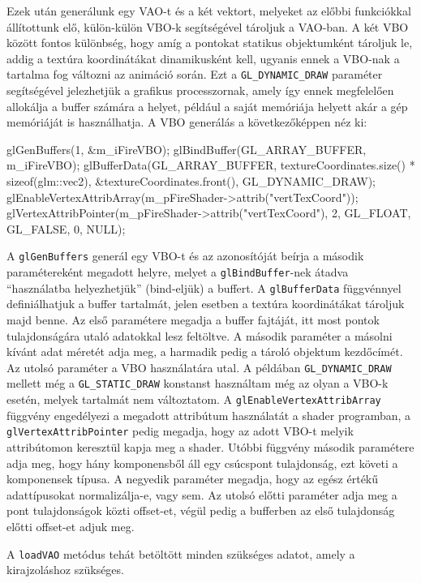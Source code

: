 Ezek után generálunk egy VAO-t és a két vektort, melyeket az előbbi funkciókkal állítottunk elő, külön-külön VBO-k segítségével tároljuk a VAO-ban. A két VBO között fontos különbség, hogy amíg a pontokat statikus objektumként tároljuk le, addig a textúra koordinátákat dinamikusként kell, ugyanis ennek a VBO-nak a tartalma fog változni az animáció során. Ezt a \texttt{GL\_DYNAMIC\_DRAW} paraméter segítségével jelezhetjük a grafikus processzornak, amely így ennek megfelelően allokálja a buffer számára a helyet, például a saját memóriája helyett akár a gép memóriáját is használhatja.
A VBO generálás a következőképpen néz ki:
\begin{cpp}
glGenBuffers(1, &m_iFireVBO);
glBindBuffer(GL_ARRAY_BUFFER, m_iFireVBO);
glBufferData(GL_ARRAY_BUFFER, 
	textureCoordinates.size() * sizeof(glm::vec2), 
	&textureCoordinates.front(), GL_DYNAMIC_DRAW);
glEnableVertexAttribArray(m_pFireShader->attrib("vertTexCoord"));
glVertexAttribPointer(m_pFireShader->attrib("vertTexCoord"), 2, 
	GL_FLOAT, GL_FALSE, 0, NULL);
\end{cpp}
A \texttt{glGenBuffers} generál egy VBO-t és az azonosítóját beírja a második paramétereként megadott helyre, melyet a \texttt{glBindBuffer}-nek átadva ``használatba helyezhetjük'' (bind-eljük) a buffert. A \texttt{glBufferData} függvénnyel definiálhatjuk a buffer tartalmát, jelen esetben a textúra koordinátákat tároljuk majd benne. Az első paramétere megadja a buffer fajtáját, itt most pontok tulajdonságára utaló adatokkal lesz feltöltve. A második paraméter a másolni kívánt adat méretét adja meg, a harmadik pedig a tároló objektum kezdőcímét. Az utolsó paraméter a VBO használatára utal. A példában \texttt{GL\_DYNAMIC\_DRAW} mellett még a \texttt{GL\_STATIC\_DRAW} konstanst használtam még az olyan a VBO-k esetén, melyek tartalmát nem változtatom. A \texttt{glEnableVertexAttribArray} függvény engedélyezi a megadott attribútum használatát a shader programban, a \texttt{glVertexAttribPointer} pedig megadja, hogy az adott VBO-t melyik attribútomon keresztül kapja meg a shader. Utóbbi függvény második paramétere adja meg, hogy hány komponensből áll egy csúcspont tulajdonság, ezt követi a komponensek típusa. A negyedik paraméter megadja, hogy az egész értékű adattípusokat normalizálja-e, vagy sem. Az utolsó előtti paraméter adja meg a pont tulajdonságok közti offset-et, végül pedig a bufferben az első tulajdonság előtti offset-et adjuk meg.

A \texttt{loadVAO} metódus tehát betöltött minden szükséges adatot, amely a kirajzoláshoz szükséges.

